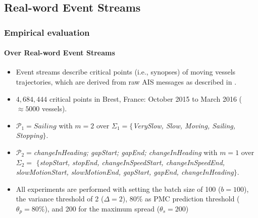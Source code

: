 \subsection{Real-word Event Streams\\}

\begin{frame}
	
	\frametitle{Empirical evaluation }
	\framesubtitle{Over Real-word Event Streams}
\begin{itemize}
	
	\item<only@1> Event streams describe critical points (i.e., synopses) of moving vessels trajectories, which are derived from raw AIS messages as described in \cite{synopses1}.
	\item<only@1> $4,684,444$ critical points  in Brest, France: October 2015 to March 2016 ($\approx5000$ vessels). 
	\item<only@1>  $\mathcal{P}_1=Sailing$ with $m=2$ over $\Sigma_1=$$\{$\textit{VerySlow, Slow, Moving,  Sailing, Stopping}$\}$.  
	\item<only@2> $\mathcal{P}_2=$\textit{changeInHeading; gapStart; gapEnd; changeInHeading} with $m=1$ over $\Sigma_2=$ 
	$\{$\textit{stopStart, stopEnd, changeInSpeedStart, changeInSpeedEnd,  slowMotionStart, slowMotionEnd, gapStart, gapEnd, changeInHeading}$\}$.
	\item<only@2> All experiments are performed with setting the batch size of 100  ($b=100$), the variance threshold of 2 ($\Delta=2$), $80\%$ as PMC prediction threshold ($\theta_{p}=80\%$), and 200 for the maximum spread ($\theta_{s}=200$)
\end{itemize}
	
\end{frame}



